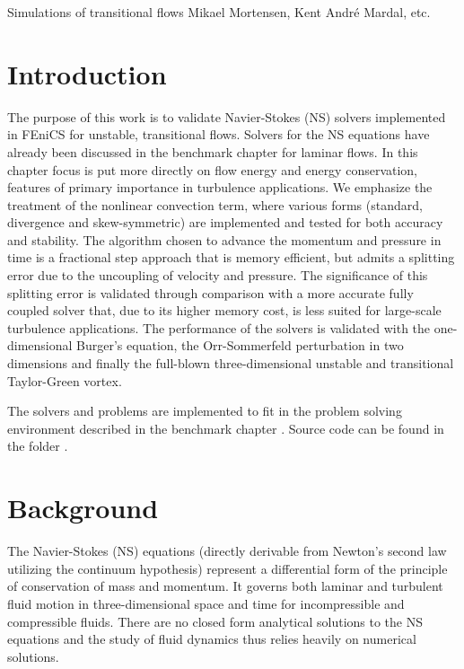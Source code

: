               {Simulations of transitional flows}
              {Mikael Mortensen, Kent Andr\'{e} Mardal, etc.}

\newcommand{\Hset}{FIXME: This is undefined!}
\newcommand{\Nset}{FIXME: This is undefined!}


\section{Introduction}

The purpose of this work is to validate Navier-Stokes (NS) solvers
implemented in FEniCS for unstable, transitional flows. Solvers for
the NS equations have already been discussed in the benchmark
chapter \cite{nsbench} for laminar flows. In this chapter focus is put
more directly on flow energy and energy conservation, features of
primary importance in turbulence applications. We emphasize the
treatment of the nonlinear convection term, where various forms
(standard, divergence and skew-symmetric) are implemented and tested
for both accuracy and stability. The algorithm chosen to advance the
momentum and pressure in time is a fractional step approach that is
memory efficient, but admits a splitting error due to the uncoupling
of velocity and pressure. The significance of this splitting error is
validated through comparison with a more accurate fully coupled solver
that, due to its higher memory cost, is less suited for large-scale
turbulence applications. The performance of the solvers is validated
with the one-dimensional Burger's equation, the Orr-Sommerfeld
perturbation in two dimensions and finally the full-blown
three-dimensional unstable and transitional Taylor-Green vortex.

The solvers and problems are implemented to fit in the problem solving
environment described in the benchmark chapter \cite{nsbench}. Source
code can be found in the folder \cite{folder}.

\section{Background}

The Navier-Stokes (NS) equations (directly derivable from Newton's
second law utilizing the continuum hypothesis) represent a
differential form of the principle of conservation of mass and
momentum. It governs both laminar and turbulent fluid motion in
three-dimensional space and time for incompressible and compressible
fluids. There are no closed form analytical solutions to the NS
equations and the study of fluid dynamics thus relies heavily on
numerical solutions.

